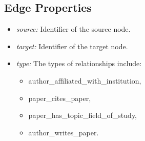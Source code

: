 \subsection*{Edge Properties}

\begin{itemize}
    \item \emph{source:} Identifier of the source node.
    \item \emph{target:} Identifier of the target node.
    \item \emph{type:} The types of relationships include:
    \begin{itemize}
        \item author\_affiliated\_with\_institution,
        \item paper\_cites\_paper,
        \item paper\_has\_topic\_field\_of\_study,
        \item author\_writes\_paper.
    \end{itemize}
\end{itemize}
